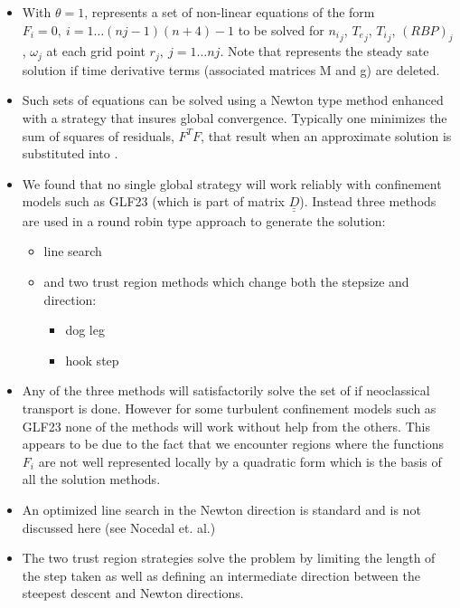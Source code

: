 \begin{itemize}
 \item With $\theta = 1$,  represents a set of non-linear equations
 of the form $F_i =0,\  i = 1\ldots(nj-1)(n+4)-1$  to be solved for ${n_i}_j$,
 ${T_e}_j$, ${T_i}_j$, $(RBP)_j$, $\omega_j $ at each grid point $r_j,\
 j=1\ldots nj$. Note that  represents the steady sate solution if
 time derivative terms (associated matrices  M and g) are deleted. \item Such
 sets of equations can be solved using a Newton type method enhanced with a
 strategy that insures global convergence. Typically one minimizes the sum of
 squares of residuals, $F^TF$, that result when an approximate solution is
 substituted into \Eqref{m10}. 
 \item We found that no single global strategy will work reliably with
 confinement models such as GLF23 (which is part of matrix
 $\underline{\underline{D}}$). Instead three methods are used in a round robin
 type approach to generate the solution: %
 \begin{itemize}
  \item line search
  \item and two trust region methods which change both
  the stepsize and direction:
  \begin{itemize}
   \item dog leg
   \item hook step
  \end{itemize}
 \end{itemize}
\end{itemize}

\begin{itemize}
 \item Any of the three methods will satisfactorily solve the set of 
 if  neoclassical transport is done. However for some turbulent confinement
 models such as GLF23 none of the methods will work without help from the
 others. This appears to be due to the fact that we encounter regions where the
 functions $F_i $ are not well represented locally by a quadratic form which is
 the basis of all the solution methods. 
 \item An optimized  line search in the Newton direction is standard and is not
 discussed here (see Nocedal et. al.)
 \item The two trust region strategies solve the problem by limiting the length
 of the step taken  as well as defining an intermediate direction between the
 steepest descent and Newton directions.
\end{itemize}

